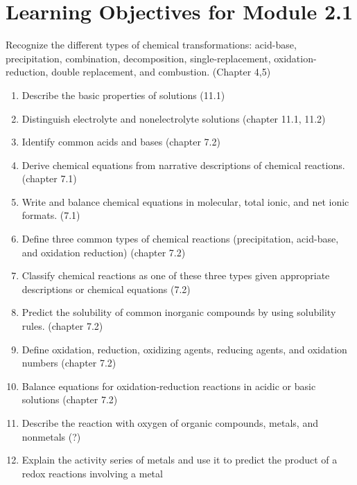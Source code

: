 \section*{Learning Objectives for Module 2.1}


Recognize the different types of chemical transformations: acid-base, precipitation, combination,
decomposition, single-replacement, oxidation-reduction, double replacement, and combustion.
(Chapter 4,5)


\begin{enumerate}
	\item Describe the basic properties of solutions (11.1)
	\item Distinguish electrolyte and nonelectrolyte solutions (chapter 11.1, 11.2)
	\item Identify common acids and bases (chapter 7.2)
	\item Derive chemical equations from narrative descriptions of chemical reactions.(chapter 7.1)
	\item Write and balance chemical equations in molecular, total ionic, and net ionic formats. (7.1)
	\item Define three common types of chemical reactions (precipitation, acid-base, and oxidation reduction) (chapter 7.2)
	\item Classify chemical reactions as one of these three types given appropriate descriptions or chemical equations (7.2)
	\item Predict the solubility of common inorganic compounds by using solubility rules. (chapter 7.2)
	\item Define oxidation, reduction, oxidizing agents, reducing agents, and oxidation numbers (chapter 7.2)
	\item Balance equations for oxidation-reduction reactions in acidic or basic solutions (chapter 7.2)
	\item Describe the reaction with oxygen of organic compounds, metals, and nonmetals (?)
	\item Explain the activity series of metals and use it to predict the product of a redox reactions involving a metal
\end{enumerate}

